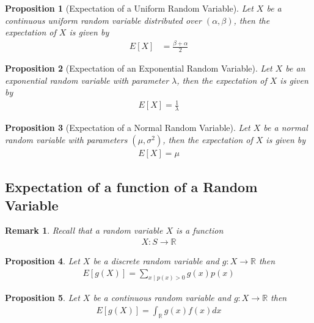 \documentclass[11pt, oneside]{book}   	%
\newtheorem{remark}{Remark}[chapter]
\newtheorem{proposition}{Proposition}[chapter]
\begin{document}
\begin{spacing}{1.618}
\begin{proposition}[Expectation of a Uniform Random Variable]
	Let $X$ be a continuous uniform random variable distributed over $(\alpha, \beta)$, then the expectation of $X$ is given by 
	\begin{alignat}{4}
		E[X]&=\frac{\beta+\alpha}{2}
	\end{alignat}
\end{proposition}

\begin{proposition}[Expectation of an Exponential Random Variable]
	Let $X$ be an exponential random variable with parameter $\lambda$, then the expectation of $X$ is given by 
	\begin{alignat}{4}
		E[X]=\frac{1}{\lambda}
	\end{alignat}
\end{proposition}

\begin{proposition}[Expectation of a Normal Random Variable]
	Let $X$ be a normal random variable with parameters $(\mu, \sigma^2)$, then the expectation of $X$ is given by 
	\begin{alignat}{4}
		E[X]=\mu
	\end{alignat}
\end{proposition}

\subsection{Expectation of a function of a Random Variable}

\begin{remark}
	Recall that a random variable $X$ is a function 
	\begin{alignat}{4}
		X:S\to \mathbb{R}
	\end{alignat}
\end{remark}

\begin{proposition}
	Let $X$ be a discrete random variable and $g:X\to \mathbb{R}$ then 
	\begin{alignat}{4}
		E[g(X)]=\sum_{x\mid p(x)>0}g(x)p(x)
	\end{alignat}
\end{proposition}

\begin{proposition}
	Let $X$ be a continuous random variable and $g:X\to\mathbb{R}$ then 
	\begin{alignat}{4}
		E[g(X)]=\int_{\mathbb{R}}g(x)f(x)dx
	\end{alignat}
\end{proposition}


\end{spacing}
\end{document}

